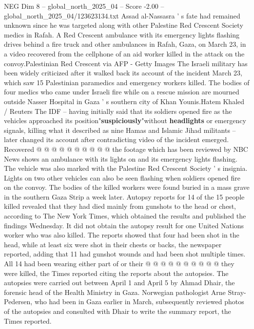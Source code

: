 \begin{textsample}{NEG Dim 8 – global\_north\_2025\_04 – Score -2.00 – global\_north\_2025\_04/123623134.txt}  \label{ex:f8_neg_088}
Assad al-Nassasra ' s fate had remained unknown since he was targeted along with other Palestine Red Crescent Society medics in Rafah.
A Red Crescent ambulance with its emergency lights flashing drives behind a fire truck and other ambulances in Rafah, Gaza, on March 23, in a video recovered from the cellphone of an aid worker killed in the attack on the convoy.Palestinian Red Crescent via AFP - Getty Images The Israeli military has been widely criticized after it walked back its account of the incident March 23, which saw 15 Palestinian paramedics and emergency workers killed.
The bodies of four medics who came under Israeli fire while on a rescue mission are mourned outside Nasser Hospital in Gaza ' s southern city of Khan Younis.Hatem Khaled / Reuters The IDF -- having initially said that its soldiers opened fire as the vehicles approached its position"\textbf{suspiciously}"without \textbf{headlights} or emergency signals, killing what it described as nine Hamas and Islamic Jihad militants -- later changed its account after contradicting video of the incident emerged.
Recovered @ @ @ @ @ @ @ @ @ @ the footage which has been reviewed by NBC News shows an ambulance with its lights on and its emergency lights flashing.
The vehicle was also marked with the Palestine Red Crescent Society ' s insignia.
Lights on two other vehicles can also be seen flashing when soldiers opened fire on the convoy.
The bodies of the killed workers were found buried in a mass grave in the southern Gaza Strip a week later.
Autopsy reports for 14 of the 15 people killed revealed that they had died mainly from gunshots to the head or chest, according to The New York Times, which obtained the results and published the findings Wednesday.
It did not obtain the autopsy result for one United Nations worker who was also killed.
The reports showed that four had been shot in the head, while at least six were shot in their chests or backs, the newspaper reported, adding that 11 had gunshot wounds and had been shot multiple times.
All 14 had been wearing either part of or their @ @ @ @ @ @ @ @ @ @ they were killed, the Times reported citing the reports about the autopsies.
The autopsies were carried out between April 1 and April 5 by Ahmad Dhair, the forensic head of the Health Ministry in Gaza.
Norwegian pathologist Arne Stray-Pedersen, who had been in Gaza earlier in March, subsequently reviewed photos of the autopsies and consulted with Dhair to write the summary report, the Times reported.

\end{textsample}
